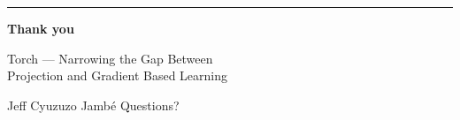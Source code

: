 \documentclass[aspectratio=169,10pt]{beamer}
\begin{document}
{
\begin{frame}[plain]
  \vspace{48pt}
  \hspace{24pt}\begin{minipage}{0.92\textwidth}
    {\color{SPRING}\rule{42pt}{4pt}}\par
    \vskip18pt
    {\fontsize{62}{66}\selectfont\bfseries\color{white}Thank you}\par
    \vskip22pt
    {\large{}Torch --- Narrowing the Gap Between\\[4pt]
    Projection and Gradient Based Learning}\par
    \vskip16pt
    {\color{MUT}Jeff Cyuzuzo Jamb\'e \quad\textbullet\quad Questions?}
  \end{minipage}
\end{frame}}

\end{document}
